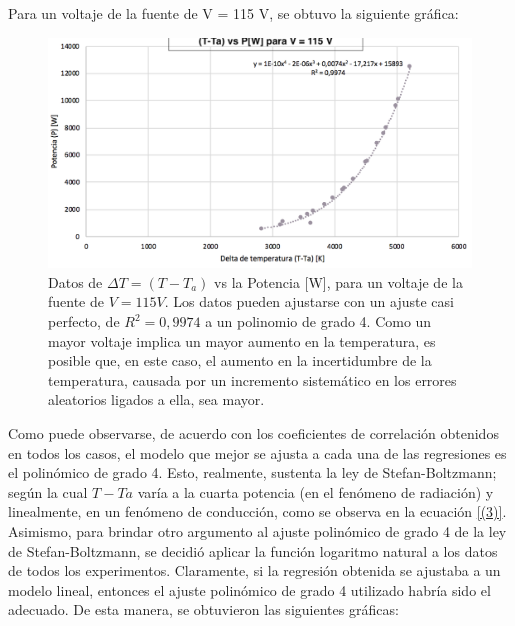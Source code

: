 \documentclass[%
 reprint,
 amsmath,amssymb,
 aps,
]{revtex4-1}
\begin{document}
Para un voltaje de la fuente de V = 115 V, se obtuvo la siguiente gráfica: 
\begin{figure}[H]
    \centering
    \includegraphics[scale= 0.3]{graf4.png}
    \caption{Datos de $\Delta T = (T - T_{a})$ vs la Potencia [W], para un voltaje de la fuente de $V = 115 V$. Los datos pueden ajustarse con un ajuste casi perfecto, de $R^2 = 0,9974$ a un polinomio de grado 4. Como un mayor voltaje implica un mayor aumento en la temperatura, es posible que, en este caso, el aumento en la incertidumbre de la temperatura, causada por  un incremento sistemático en los errores aleatorios ligados a ella, sea mayor.}
    \label{fig:Figura 5}
\end{figure}

Como puede observarse, de acuerdo con los coeficientes de correlación obtenidos en todos los casos, el modelo que mejor se ajusta a cada una de las regresiones es el polinómico de grado 4. Esto, realmente, sustenta la ley de Stefan-Boltzmann; según la cual $T -T{a}$ varía a la cuarta potencia (en el fenómeno de radiación) y linealmente, en un fenómeno de conducción, como se observa en la ecuación \ref{(3)}. \\

Asimismo, para brindar otro argumento al ajuste polinómico de grado 4 de la ley de Stefan-Boltzmann, se decidió aplicar la función logaritmo natural a los datos de todos los experimentos. Claramente, si la regresión obtenida se ajustaba a un modelo lineal, entonces el ajuste polinómico de grado 4 utilizado habría sido el adecuado. De esta manera, se obtuvieron las siguientes gráficas:
\end{document}
